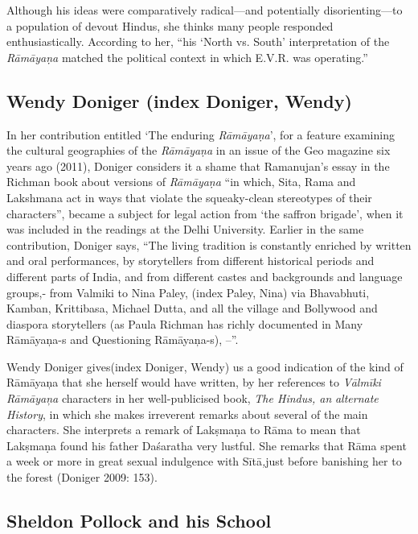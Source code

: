 Although his ideas were comparatively radical—and potentially disorienting—to a population of devout Hindus, she thinks many people responded enthusiastically. According to her, “his ‘North vs. South’ interpretation of the \textit{Rāmāyaṇa} matched the political context in which E.V.R. was operating.”


\subsection{Wendy Doniger (index Doniger, Wendy)}

\item In her contribution entitled ‘The enduring \textit{Rāmāyaṇa}’, for a feature examining the cultural geographies of the \textit{Rāmāyaṇa} in an issue of the Geo magazine six years ago (2011), Doniger considers it a shame that Ramanujan’s essay in the Richman book about versions of \textit{Rāmāyaṇa} “in which, Sita, Rama and Lakshmana act in ways that violate the squeaky-clean stereotypes of their characters”, became a subject for legal action from ‘the saffron brigade’, when it was included in the readings at the Delhi University. Earlier in the same contribution, Doniger says, “The living tradition is constantly enriched by written and oral performances, by storytellers from different historical periods and different parts of India, and from different castes and backgrounds and language groups,- from Valmiki to Nina Paley, (index Paley, Nina) via Bhavabhuti, Kamban, Krittibasa, Michael Dutta, and all the village and Bollywood and diaspora storytellers (as Paula Richman has richly documented in Many Rāmāyaņa-s and Questioning Rāmāyaņa-s), --”.

 \item Wendy Doniger gives(index Doniger, Wendy) us a good indication of the kind of Rāmāyaņa that she herself would have written, by her references to \textit{Vālmīki Rāmāyaņa} characters in her well-publicised book, \textit{The Hindus, an} \textit{alternate History}, in which she makes irreverent remarks about several of the main characters. She interprets a remark of Lakṣmaṇa to Rāma to mean that Lakṣmaṇa found his father Daśaratha very lustful. She remarks that Rāma spent a week or more in great sexual indulgence with Sītā\textit{,}just before banishing her to the forest (Doniger 2009: 153).



\subsection{Sheldon Pollock and his School}

